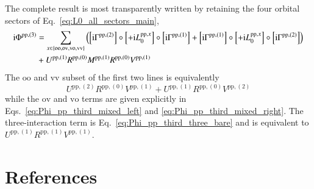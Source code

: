 \documentclass[aip,jcp,reprint,noshowkeys,superscriptaddress]{revtex4-1}
\newcommand{\ii}{\mathrm{i}}
\newcommand{\pp}{\text{pp}}
\begin{document}
The complete result is most transparently written by retaining the four
orbital sectors of Eq.~\eqref{eq:L0_all_sectors_main},
\begin{equation}
    \begin{split}
    \ii\Phi^{\pp,(3)}
    &=
    \sum_{x\in\{\text{oo},\text{ov},\text{vo},\text{vv}\}}
    \qty(
    \left[\ii\Gamma^{\pp,(2)}\right]
    \circ\left[+\ii L_0^{\pp,x}\right]
    \circ\left[\ii\Gamma^{\pp,(1)}\right]
    +
    \left[\ii\Gamma^{\pp,(1)}\right]
    \circ\left[+\ii L_0^{\pp,x}\right]
    \circ\left[\ii\Gamma^{\pp,(2)}\right]
    )
    \\
    &+
    U^{\pp,(1)}R^{\pp,(0)}M^{\pp,(1)}R^{\pp,(0)}V^{\pp,(1)}
    \end{split}
    \label{eq:Phi_pp_third_final}
\end{equation}
The $\text{oo}$ and $\text{vv}$ subset of the first two lines is equivalently
\begin{equation}
    U^{\pp,(2)}R^{\pp,(0)}V^{\pp,(1)}
    +
    U^{\pp,(1)}R^{\pp,(0)}V^{\pp,(2)}
    \label{eq:Phi_pp_third_oovv_resolvent}
\end{equation}
while the $\text{ov}$ and $\text{vo}$ terms are given explicitly in
Eqs.~\eqref{eq:Phi_pp_third_mixed_left} and
\eqref{eq:Phi_pp_third_mixed_right}.
The three-interaction term is Eq.~\eqref{eq:Phi_pp_third_three_bare} and is
equivalent to $U^{\pp,(1)}R^{\pp,(1)}V^{\pp,(1)}$.

\section*{References}


\end{document}
